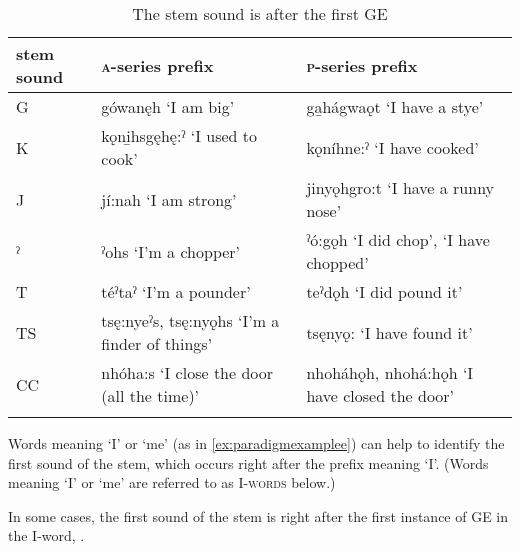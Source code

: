 \begin{table}
\caption{The stem sound is after the first GE}
\label{figtab:1:fstge}
{
\begin{tabularx}{\textwidth}{lQQ}
\lsptoprule
stem sound & \textsc{a}-series prefix & \textsc{p}-series prefix\\
\midrule
 G & gówanęh \newline ‘I am big’ & ga̱hágwaǫt \newline ‘I have a stye’\\
 \tablevspace
 K & kǫni̱hsg{ę}hę:ˀ \newline ‘I used to cook’ & kǫníhne:ˀ \newline ‘I have cooked’\\
 \tablevspace
 J & jí:nah \newline ‘I am strong’ & jinyǫhgro:t \newline ‘I have a runny nose’\\
\tablevspace
ˀ & ˀohs \newline ‘I’m a chopper’ & ˀó:gǫh \newline ‘I did chop’,  ‘I have chopped’\\
\tablevspace
T & téˀtaˀ \newline ‘I’m a pounder’ & teˀdǫh \newline ‘I did pound it’\\
\tablevspace
TS & ts{ę}:nyeˀs, ts{ę}:nyǫhs \newline ‘I’m a finder of things’ & tsęnyǫ: \newline ‘I have found it’\\
\tablevspace
 CC & nhóha:s \newline ‘I close the door (all the time)’ & nhoháhǫh, nhohá:hǫh \newline ‘I have closed the door’\\
\lspbottomrule
\end{tabularx}}
\end{table}


Words meaning ‘I’ or ‘me’ (as in \ref{ex:paradigmexamplee}) can help to identify the first sound of the stem, which occurs right after the prefix meaning ‘I’. (Words meaning ‘I’ or ‘me’ are referred to as \textsc{I-words} below.) 

\FloatBarrier
In some cases, the first sound of the stem is right after the first instance of GE in the I-word, .


